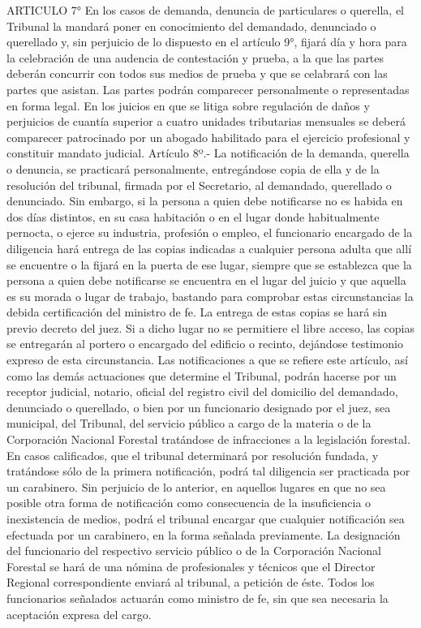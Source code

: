    ARTICULO 7° En los casos de demanda, denuncia de particulares o querella, el Tribunal la mandará poner en conocimiento del demandado, denunciado o querellado y, sin perjuicio de lo dispuesto en el artículo 9°, fijará día y hora para la celebración de una audencia de contestación y prueba, a la que las partes deberán concurrir con todos sus medios de prueba y que se celabrará con las partes que asistan.
    Las partes podrán comparecer personalmente o representadas en forma legal. En los juicios en que se litiga sobre regulación de daños y perjuicios de cuantía superior a cuatro unidades tributarias mensuales se deberá comparecer patrocinado por un abogado habilitado para el ejercicio profesional y constituir mandato judicial.
    Artículo 8º.- La notificación de la demanda, querella o denuncia, se practicará personalmente, entregándose copia de ella y de la resolución del tribunal, firmada por el Secretario, al demandado, querellado o denunciado.
    Sin embargo, si la persona a quien debe notificarse no es habida en dos días distintos, en su casa habitación o en el lugar donde habitualmente pernocta, o ejerce su industria, profesión o empleo, el funcionario encargado de la diligencia hará entrega de las copias indicadas a cualquier persona adulta que allí se encuentre o la fijará en la puerta de ese lugar, siempre que se establezca que la persona a quien debe notificarse se encuentra en el lugar del juicio y que aquella es su morada o lugar de trabajo, bastando para comprobar estas circunstancias la debida certificación del ministro de fe. La entrega de estas copias se hará sin previo decreto del juez. Si a dicho lugar no se permitiere el libre acceso, las copias se entregarán al portero o encargado del edificio o recinto, dejándose testimonio expreso de esta circunstancia.
    Las notificaciones a que se refiere este artículo, así como las demás actuaciones que determine el Tribunal, podrán hacerse por un receptor judicial, notario, oficial del registro civil del domicilio del demandado, denunciado o querellado, o bien por un funcionario designado por el juez, sea municipal, del Tribunal, del servicio público a cargo de la materia o de la Corporación Nacional Forestal tratándose de infracciones a la legislación forestal. En casos calificados, que el tribunal determinará por resolución fundada, y tratándose sólo de la primera notificación, podrá tal diligencia ser practicada por un carabinero. Sin perjuicio de lo anterior, en aquellos lugares en que no sea posible otra forma de notificación como consecuencia de la insuficiencia o inexistencia de medios, podrá el tribunal encargar que cualquier notificación sea efectuada por un carabinero, en la forma señalada previamente. La designación del funcionario del respectivo servicio público o de la Corporación Nacional Forestal se hará de una nómina de profesionales y técnicos que el Director Regional correspondiente enviará al tribunal, a petición de éste. Todos los funcionarios señalados actuarán como ministro de fe, sin que sea necesaria la aceptación expresa del cargo.
